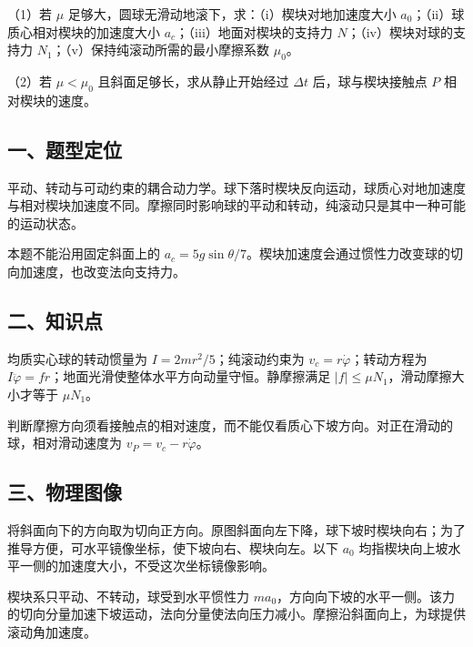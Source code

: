 \documentclass[12pt,a4paper,fontset=fandol]{ctexart}
\begin{document}
（1）若 \(\mu\) 足够大，圆球无滑动地滚下，求：（i）楔块对地加速度大小
\(a_0\)；（ii）球质心相对楔块的加速度大小
\(a_c\)；（iii）地面对楔块的支持力 \(N\)；（iv）楔块对球的支持力
\(N_1\)；（v）保持纯滚动所需的最小摩擦系数 \(\mu_0\)。

（2）若 \(\mu<\mu_0\) 且斜面足够长，求从静止开始经过 \(\Delta t\)
后，球与楔块接触点 \(P\) 相对楔块的速度。

\subsection{一、题型定位}\label{ux4e00ux9898ux578bux5b9aux4f4d-2}

平动、转动与可动约束的耦合动力学。球下落时楔块反向运动，球质心对地加速度与相对楔块加速度不同。摩擦同时影响球的平动和转动，纯滚动只是其中一种可能的运动状态。

本题不能沿用固定斜面上的
\(a_c=5g\sin\theta/7\)。楔块加速度会通过惯性力改变球的切向加速度，也改变法向支持力。

\subsection{二、知识点}\label{ux4e8cux77e5ux8bc6ux70b9-2}

均质实心球的转动惯量为 \(I=2mr^2/5\)；纯滚动约束为
\(v_c=r\dot\varphi\)；转动方程为
\(I\ddot\varphi=fr\)；地面光滑使整体水平方向动量守恒。静摩擦满足
\(|f|\le\mu N_1\)，滑动摩擦大小才等于 \(\mu N_1\)。

判断摩擦方向须看接触点的相对速度，而不能仅看质心下坡方向。对正在滑动的球，相对滑动速度为
\(v_P=v_c-r\dot\varphi\)。

\subsection{三、物理图像}\label{ux4e09ux7269ux7406ux56feux50cf-2}

将斜面向下的方向取为切向正方向。原图斜面向左下降，球下坡时楔块向右；为了推导方便，可水平镜像坐标，使下坡向右、楔块向左。以下
\(a_0\) 均指楔块向上坡水平一侧的加速度大小，不受这次坐标镜像影响。

楔块系只平动、不转动，球受到水平惯性力
\(ma_0\)，方向向下坡的水平一侧。该力的切向分量加速下坡运动，法向分量使法向压力减小。摩擦沿斜面向上，为球提供滚动角加速度。
\end{document}
